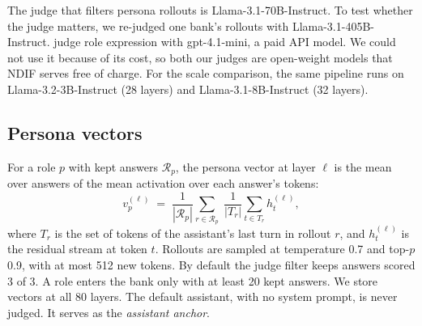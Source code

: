 The judge that filters persona rollouts is Llama-3.1-70B-Instruct. %
To test whether the judge matters, we re-judged one bank's rollouts with Llama-3.1-405B-Instruct. %
\textcite[p.~3]{lu2026assistant} judge role expression with gpt-4.1-mini, a paid API model. We could not use it because of its cost, so both our judges are open-weight models that NDIF serves free of charge. %
For the scale comparison, the same pipeline runs on Llama-3.2-3B-Instruct (28 layers) and Llama-3.1-8B-Instruct (32 layers). %

\subsection{Persona vectors}
\label{sec:m-vectors}

For a role $p$ with kept answers $\mathcal{R}_p$, the persona vector at layer $\ell$ is the mean over answers of the mean activation over each answer's tokens:
\begin{equation}
  v_p^{(\ell)} \;=\; \frac{1}{|\mathcal{R}_p|}\sum_{r\in\mathcal{R}_p}\;\frac{1}{|T_r|}\sum_{t\in T_r} h_t^{(\ell)},
  \label{eq:m-persona}
\end{equation}
where $T_r$ is the set of tokens of the assistant's last turn in rollout $r$, and $h_t^{(\ell)}$ is the residual stream at token $t$. %
Rollouts are sampled at temperature 0.7 and top-$p$ 0.9, with at most 512 new tokens. %
By default the judge filter keeps answers scored 3 of 3. %
A role enters the bank only with at least 20 kept answers. %
We store vectors at all 80 layers. %
The default assistant, with no system prompt, is never judged. It serves as the \emph{assistant anchor}. %

